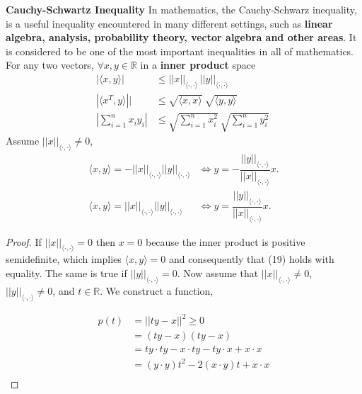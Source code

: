 \documentclass[12pt]{article}
\newenvironment{definition}[2][Definition]{\begin{trivlist}
\item[\hskip \labelsep {\bfseries #1}\hskip \labelsep {\bfseries #2}]}{\end{trivlist}}
\begin{document}
\begin{definition}{2.12} \textbf{Cauchy-Schwartz Inequality} In mathematics, the Cauchy-Schwarz inequality, is a useful inequality encountered in many different settings, such as \textbf{linear algebra, analysis, probability theory, vector algebra and other areas}. It is considered to be one of the most important inequalities in all of mathematics. For any two vectors, \(\forall x, y \in \mathbb{R}\) in a \textbf{inner product} space
\begin{equation}
\begin{split}
    |\langle x, y \rangle| &\leq ||x||_{\langle \cdot, \cdot \rangle} \, ||y||_{\langle \cdot, \cdot \rangle} \\
    |\langle x^T, y \rangle|| &\leq \sqrt{\langle x,x \rangle}\ \sqrt{\langle y,y \rangle}\ \\
    |\sum^n_{i=1} x_i y_i| &\leq \sqrt{\sum^n_{i=1} x_i^2}\ \sqrt{\sum^n_{i=1} y_i^2}\
\end{split}
\end{equation}
\noindent
Assume \(||x||_{\langle \cdot, \cdot \rangle} \neq 0\),
\begin{equation}
\begin{split}
    \langle x, y \rangle = -||x||_{\langle \cdot, \cdot \rangle}||y||_{\langle \cdot, \cdot \rangle} &\iff y = -\dfrac{||y||_{\langle \cdot, \cdot \rangle}}{||x||_{\langle \cdot, \cdot \rangle}}x. \\
    \langle x, y \rangle = ||x||_{\langle \cdot, \cdot \rangle}||y||_{\langle \cdot, \cdot \rangle} &\iff y = \dfrac{||y||_{\langle \cdot, \cdot \rangle}}{||x||_{\langle \cdot, \cdot \rangle}}x.
\end{split}
\end{equation}

\begin{proof}
If \(||x||_{\langle \cdot, \cdot \rangle} = 0\) then \(x=0\) because the inner product is positive semidefinite, which implies \(\langle x,y \rangle = 0\) and consequently that (19) holds with equality. The same is true if \(||y||_{\langle \cdot, \cdot \rangle} = 0\).
\noindent
Now assume that \(||x||_{\langle \cdot, \cdot \rangle} \neq 0\), \(||y||_{\langle \cdot, \cdot \rangle} \neq 0\), and \(t \in \mathbb{R}\). We construct a function,

\begin{equation}
\begin{split}
    p(t) &= ||ty - x||^2 \geq 0 \\
    &= (ty - x)(ty - x) \\
    &= ty \cdot ty - x \cdot ty - ty \cdot x + x \cdot x \\
    &= (y \cdot y)t^2 - 2(x\cdot y)t + x\cdot x \\
\end{split}
\end{equation}


\end{proof}
\end{definition}
\end{document}
